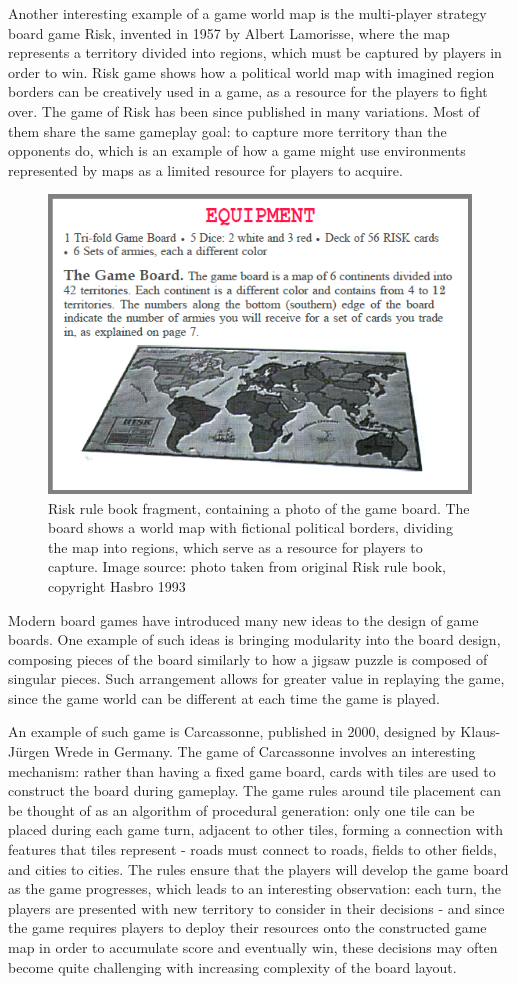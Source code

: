 \documentclass[12pt]{report}
\begin{document}
Another interesting example of a game world map is the multi-player strategy board game Risk, invented in 1957 by Albert Lamorisse, where the map represents a territory divided into regions, which must be captured by players in order to win. Risk game shows how a political world map with imagined region borders can be creatively used in a game, as a resource for the players to fight over. The game of Risk has been since published in many variations. Most of them share the same gameplay goal: to capture more territory than the opponents do, which is an example of how a game might use environments represented by maps as a limited resource for players to acquire.
 
\begin{figure}[h]
	\centering
	\includegraphics[width=0.5\linewidth]{images/risk-rulebook} 
	\caption{Risk rule book fragment, containing a photo of the game board. The board shows a world map with fictional political borders, dividing the map into regions, which serve as a resource for players to capture. Image source: photo taken from original Risk rule book, copyright Hasbro 1993}
	\label{fig:acrord32risk1}
\end{figure}

Modern board games have introduced many new ideas to the design of game boards. One example of such ideas is bringing modularity into the board design, composing pieces of the board similarly to how a jigsaw puzzle is composed of singular pieces. Such arrangement allows for greater value in replaying the game, since the game world can be different at each time the game is played. 

An example of such game is Carcassonne, published in 2000, designed by Klaus-Jürgen Wrede in Germany. The game of Carcassonne involves an interesting mechanism: rather than having a fixed game board, cards with tiles are used to construct the board during gameplay. The game rules around tile placement can be thought of as an algorithm of procedural generation: only one tile can be placed during each game turn, adjacent to other tiles, forming a connection with features that tiles represent - roads must connect to roads, fields to other fields, and cities to cities. The rules ensure that the players will develop the game board as the game progresses, which leads to an interesting observation: each turn, the players are presented with new territory to consider in their decisions - and since the game requires players to deploy their resources onto the constructed game map in order to accumulate score and eventually win, these decisions may often become quite challenging with increasing complexity of the board layout.
\end{document}
